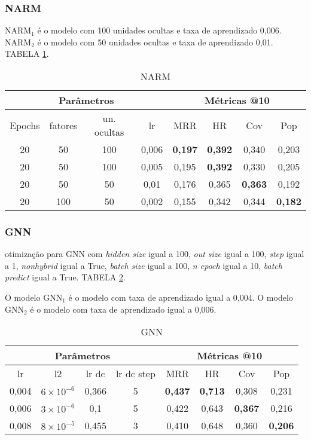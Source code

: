 \subsubsection{NARM}
$\text{NARM}_{1}$ é o modelo com 100 unidades ocultas e taxa de aprendizado 0,006.
$\text{NARM}_{2}$ é o modelo com 50 unidades ocultas e taxa de aprendizado 0,01.
TABELA \ref{app:narm2}.
\begin{table}[htbp]
  \centering
  \begin{tabular}{|c|c|c|c|c|c|c|c|}
    \hline
      \multicolumn{4}{|c|}{Parâmetros} & \multicolumn{4}{c|}{Métricas @10} \\
      \hline
      Epochs & fatores & un. ocultas & lr & MRR & HR & Cov & Pop \\
      \hline
      20 & 50 & 100 & 0,006 & \textbf{0,197} & \textbf{0,392} & 0,340 & 0,203 \\
      \hline
      20 & 50 & 100 & 0,005 & 0,195 & \textbf{0,392} & 0,330 & 0,205 \\
      \hline
      20 & 50 & 50 & 0,01 & 0,176 & 0,365 & \textbf{0,363} & 0,192 \\
      \hline
      20 & 100 & 50 & 0,002 & 0,155 & 0,342 & 0,344 & \textbf{0,182} \\
      \hline
      \end{tabular}
      \caption{NARM}
      \label{app:narm2}
\end{table}

\subsubsection{GNN}
otimização para GNN com \textit{hidden size} igual a 100, \textit{out size} igual a 100,
\textit{step} igual a 1, \textit{nonhybrid} igual a True, \textit{batch size} igual a 100,
\textit{n epoch} igual a 10, \textit{batch predict} igual a True. TABELA \ref{app:gnn2}.

O modelo $\text{GNN}_{1}$ é o modelo com taxa de aprendizado igual a 0,004.
O modelo $\text{GNN}_{2}$ é o modelo com taxa de aprendizado igual a 0,006.
\begin{table}[htbp]
  \centering
  \begin{tabular}{|c|c|c|c|c|c|c|c|}
    \hline
      \multicolumn{4}{|c|}{Parâmetros} & \multicolumn{4}{c|}{Métricas @10} \\
      \hline
      lr & l2 & lr dc & lr dc step & MRR & HR & Cov & Pop \\
      \hline
      0,004 & $6 \times 10^{-6}$ & 0,366 & 5 & \textbf{0,437} & \textbf{0,713} & 0,308 & 0,231 \\
      \hline
      0,006 & $3 \times 10^{-6}$ & 0,1 & 5 & 0,422 & 0,643 & \textbf{0,367} & 0,216 \\
      \hline
      0,008 & $8 \times 10^{-5}$ & 0,455 & 3 & 0,410 & 0,648 & 0,360 & \textbf{0,206} \\
      \hline
      \end{tabular} \label{app:gnn2}
      \caption{GNN}
\end{table}

